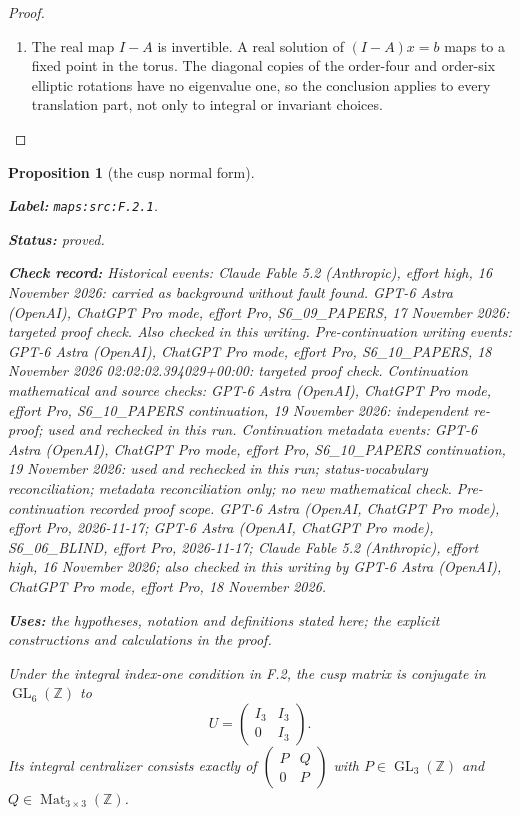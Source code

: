 \documentclass[11pt,a4paper]{article}
\newtheorem{proposition}[proposition]{Proposition}
\theoremstyle{definition}
\newcommand{\StatementRecord}[4]{\par\smallskip\begingroup\upshape\raggedright\noindent\textbf{Label:} \nolinkurl{#1}.\par\noindent\textbf{Status:} #2.\par\noindent\textbf{Check record:} #3.\par\noindent\textbf{Uses:} #4.\par\endgroup\smallskip}
\begin{document}
\begin{proof}
\begin{enumerate}[label=\arabic*.]
\item The real map $I-A$ is invertible.  A real solution of
$(I-A)x=b$ maps to a fixed point in the torus.  The diagonal
copies of the order-four and order-six elliptic rotations have
no eigenvalue one, so the conclusion applies to every translation
part, not only to integral or invariant choices.

\end{enumerate}
\end{proof}




\begin{proposition}[the cusp normal form]\label{maps:src:F.2.1}
\StatementRecord{maps:src:F.2.1}{proved}{Historical events: Claude Fable 5.2 (Anthropic), effort high, 16 November 2026: carried as background without fault found. GPT-6 Astra (OpenAI), ChatGPT Pro mode, effort Pro, S6\_09\_PAPERS, 17 November 2026: targeted proof check. Also checked in this writing. Pre-continuation writing events: GPT-6 Astra (OpenAI), ChatGPT Pro mode, effort Pro, S6\_10\_PAPERS, 18 November 2026 02:02:02.394029+00:00: targeted proof check. Continuation mathematical and source checks: GPT-6 Astra (OpenAI), ChatGPT Pro mode, effort Pro, S6\_10\_PAPERS continuation, 19 November 2026: independent re-proof; used and rechecked in this run. Continuation metadata events: GPT-6 Astra (OpenAI), ChatGPT Pro mode, effort Pro, S6\_10\_PAPERS continuation, 19 November 2026: used and rechecked in this run; status-vocabulary reconciliation; metadata reconciliation only; no new mathematical check. \emph{Pre-continuation recorded proof scope.} GPT-6 Astra (OpenAI, ChatGPT Pro mode), effort Pro, 2026-11-17; GPT-6 Astra (OpenAI, ChatGPT Pro mode), S6\_06\_BLIND, effort Pro, 2026-11-17; Claude Fable 5.2 (Anthropic), effort high, 16 November 2026; also checked in this writing by GPT-6 Astra (OpenAI), ChatGPT Pro mode, effort Pro, 18 November 2026}{the hypotheses, notation and definitions stated here; the explicit constructions and calculations in the proof}


Under the integral index-one condition in F.2, the cusp matrix is
conjugate in $\operatorname{GL}_6(\mathbb Z)$ to
\[
 U=\begin{pmatrix}I_3&I_3\\0&I_3\end{pmatrix}.
\]
Its integral centralizer consists exactly of
$\left(\begin{smallmatrix}P&Q\\0&P\end{smallmatrix}\right)$
with $P\in\operatorname{GL}_3(\mathbb Z)$ and
$Q\in\operatorname{Mat}_{3\times3}(\mathbb Z)$.

\end{proposition}
\end{document}
